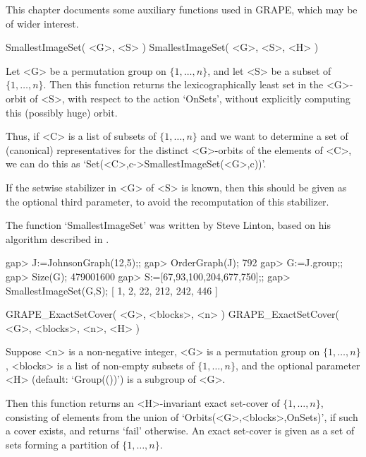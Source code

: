 %
%
%
%
\def\GRAPE{\sf GRAPE}
\def\nauty{\it nauty}
\def\G{\Gamma}
\def\Aut{{\rm Aut}\,}
\def\x{\times}

This chapter documents some auxiliary functions used in {\GRAPE},
which may be of wider interest. 


\>SmallestImageSet( <G>, <S> )
\>SmallestImageSet( <G>, <S>, <H> )

Let <G> be a permutation group on $\{1,\ldots,n\}$, and let <S>
be a subset of $\{1,\ldots,n\}$. Then this function returns the
lexicographically least set in the <G>-orbit of <S>, with respect to the
action `OnSets', without explicitly computing this (possibly huge) orbit.

Thus, if <C> is a list of subsets of $\{1,\ldots,n\}$ and we
want to determine a set of (canonical) representatives for the
distinct <G>-orbits of the elements of <C>, we can do this as
`Set(<C>,c->SmallestImageSet(<G>,c))'.

If the setwise stabilizer in <G> of <S> is known, then this should be
given as the optional third parameter, to avoid the recomputation of
this stabilizer.

The function `SmallestImageSet' was written by Steve Linton, based
on his algorithm described in \cite{Lin04}. 

\beginexample
gap> J:=JohnsonGraph(12,5);;
gap> OrderGraph(J);
792
gap> G:=J.group;;
gap> Size(G);
479001600
gap> S:=[67,93,100,204,677,750];;
gap> SmallestImageSet(G,S);
[ 1, 2, 22, 212, 242, 446 ]
\endexample


\>GRAPE_ExactSetCover( <G>, <blocks>, <n> )
\>GRAPE_ExactSetCover( <G>, <blocks>, <n>, <H> )

Suppose <n> is a non-negative integer, <G> is a permutation group
on $\{1,\ldots,n\}$, <blocks> is a list of non-empty subsets
of $\{1,\ldots,n\}$, and the optional parameter <H> (default:
`Group(())') is a subgroup of <G>. 

Then this function returns an <H>-invariant exact 
set-cover of $\{1,\ldots,n\}$, consisting of elements from the union of
`Orbits(<G>,<blocks>,OnSets)', if such a cover exists,
and returns  `fail'  otherwise. An exact set-cover is given as a set of
sets forming a partition of $\{1,\ldots,n\}$.


